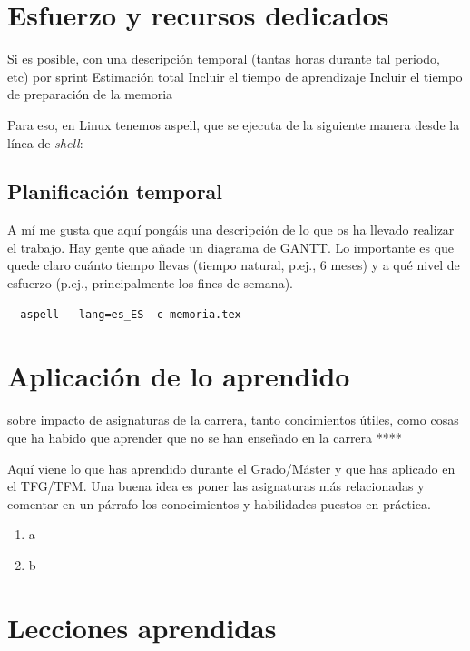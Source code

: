 \documentclass[a4paper, 12pt]{book}
\begin{document}
\section{Esfuerzo y recursos dedicados}
\label{sec:esfuerzo-recursos}

Si es posible, con una descripción temporal (tantas horas durante tal periodo, etc) por sprint
Estimación total
Incluir el tiempo de aprendizaje
Incluir el tiempo de preparación de la memoria

Para eso, en Linux tenemos aspell, que se ejecuta de la siguiente manera desde la línea de \emph{shell}:

\subsection{Planificación temporal}
\label{sec:planificacion-temporal}

A mí me gusta que aquí pongáis una descripción de lo que os ha llevado realizar el trabajo.
Hay gente que añade un diagrama de GANTT.
Lo importante es que quede claro cuánto tiempo llevas (tiempo natural, p.ej., 6 meses) y a qué nivel de esfuerzo (p.ej., principalmente los fines de semana).

\begin{verbatim}
  aspell --lang=es_ES -c memoria.tex
\end{verbatim}


\section{Aplicación de lo aprendido}
\label{sec:aplicacion}
sobre impacto de asignaturas de la carrera, tanto concimientos útiles, como cosas que ha habido que aprender que no se han enseñado en la carrera
****


Aquí viene lo que has aprendido durante el Grado/Máster y que has aplicado en el TFG/TFM.
Una buena idea es poner las asignaturas más relacionadas y comentar en un párrafo los conocimientos y habilidades puestos en práctica.

\begin{enumerate}
  \item a
  \item b
\end{enumerate}


\section{Lecciones aprendidas}
\label{sec:lecciones_aprendidas}
\end{document}
